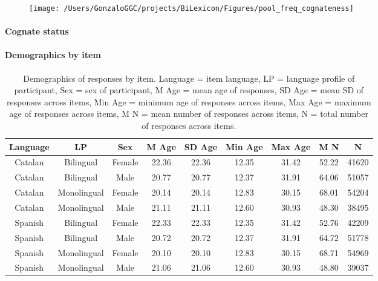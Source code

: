 \documentclass[english,man,man,floatsintext]{apa6}
\begin{document}
\begin{figure}

{\centering \texttt{[image: /Users/GonzaloGGC/projects/BiLexicon/Figures/pool\_freq\_cognateness]} 

}

\caption{ }\label{fig:unnamed-chunk-1}
\end{figure}

\hypertarget{cognate-status}{%
\paragraph{Cognate status}\label{cognate-status}}

\hypertarget{demographics-by-item}{%
\paragraph{Demographics by item}\label{demographics-by-item}}

\begin{table}

\caption{\label{tab:unnamed-chunk-2}Demographics of responses by item. Language = item language, LP = language profile of participant, Sex = sex of participant, M Age = mean age of responses, SD Age = mean SD of responses across items, Min Age = minimum age of responses across items, Max Age = maximum age of responses across items, M N = mean number of responses across items, N = total number of responses across items.}
\centering
\begin{tabular}[t]{c|c|c|c|c|c|c|c|c}
\hline
Language & LP & Sex & M Age & SD Age & Min Age & Max Age & M N & N\\
\hline
Catalan & Bilingual & Female & 22.36 & 22.36 & 12.35 & 31.42 & 52.22 & 41620\\
\hline
Catalan & Bilingual & Male & 20.77 & 20.77 & 12.37 & 31.91 & 64.06 & 51057\\
\hline
Catalan & Monolingual & Female & 20.14 & 20.14 & 12.83 & 30.15 & 68.01 & 54204\\
\hline
Catalan & Monolingual & Male & 21.11 & 21.11 & 12.60 & 30.93 & 48.30 & 38495\\
\hline
Spanish & Bilingual & Female & 22.33 & 22.33 & 12.35 & 31.42 & 52.76 & 42209\\
\hline
Spanish & Bilingual & Male & 20.72 & 20.72 & 12.37 & 31.91 & 64.72 & 51778\\
\hline
Spanish & Monolingual & Female & 20.10 & 20.10 & 12.83 & 30.15 & 68.71 & 54969\\
\hline
Spanish & Monolingual & Male & 21.06 & 21.06 & 12.60 & 30.93 & 48.80 & 39037\\
\hline
\end{tabular}
\end{table}
\end{document}
